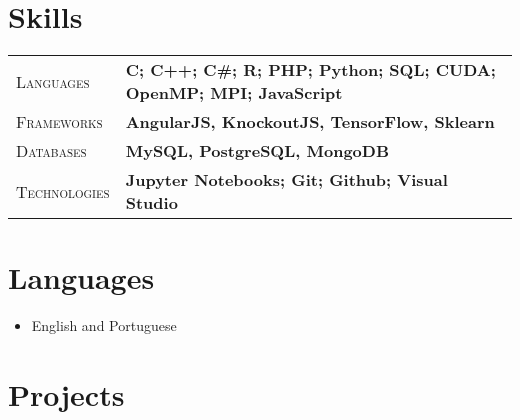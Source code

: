 \documentclass[9pt, a4paper, oneside, final]{scrartcl} %
\newcommand{\gray}{\rowcolor[gray]{.90}} %
\begin{document}

\section{Skills}

\begin{center}
\begin{tabularx}{1.0\linewidth}{>{\raggedleft\scshape}p{2.2cm}X}
\gray Languages & \textbf{C; C++; C\#; R; PHP; Python; SQL; CUDA; OpenMP; MPI; JavaScript}\\
\gray Frameworks & \textbf{AngularJS, KnockoutJS, TensorFlow, Sklearn}\\
\gray Databases & \textbf{MySQL, PostgreSQL, MongoDB}\\
\gray Technologies & \textbf{Jupyter Notebooks; Git; Github; Visual Studio}\\
\end{tabularx}
\end{center}


\section{Languages}

\begin{itemize} \itemsep1pt \parskip0pt 
  \item English and Portuguese 
\end{itemize}


\section{Projects}
\end{document}
